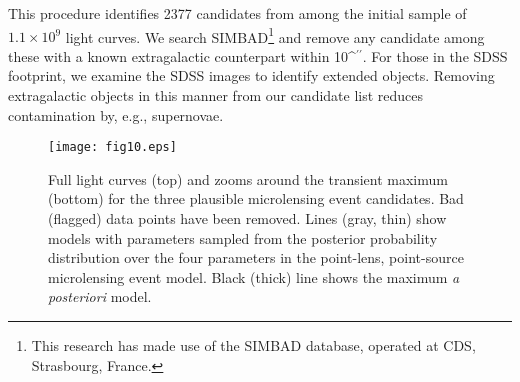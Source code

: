 \documentclass{emulateapj}
\def\asec{\ifmmode^{\prime\prime}\else$^{\prime\prime}$\fi}
\begin{document}
This procedure identifies 2377 candidates from among the initial sample of $1.1\times10^9$ light curves. We search SIMBAD\footnote{This research has made use of the SIMBAD database, operated at CDS, Strasbourg, France.} and remove any candidate among these with a known extragalactic counterpart within 10\asec. For those in the SDSS footprint, we examine the SDSS images \citep{sdss_images} to identify extended objects. Removing extragalactic objects in this manner from our candidate list reduces contamination by, e.g., supernovae. 

\begin{figure*}[htb]
\centering
\texttt{[image: fig10.eps]}
\caption{Full light curves (top) and zooms around the transient maximum (bottom) for the three plausible microlensing event candidates. Bad (flagged) data points have been removed. Lines (gray, thin) show models with parameters sampled from the posterior probability distribution over the four parameters in the point-lens, point-source microlensing event model. Black (thick) line shows the maximum {\it a posteriori} model. }\label{fig:candidates}
\end{figure*}
\end{document}
